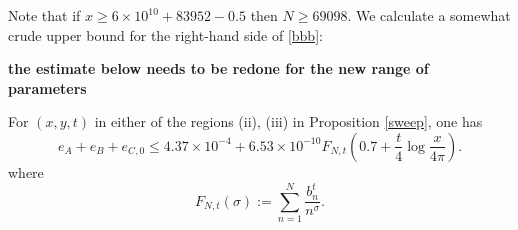 Note that if $x \geq 6 \times 10^{10} + 83952 - 0.5$ then $N \geq 69098$.  We calculate a somewhat crude upper bound for the right-hand side of \eqref{bbb}:

{\bf the estimate below needs to be redone for the new range of parameters}

\begin{lemma}\label{lac} For $(x,y,t)$ in either of the regions (ii), (iii) in Proposition \ref{sweep}, one has
$$ e_A + e_B + e_{C,0} \leq 4.37 \times 10^{-4} + 6.53 \times 10^{-10} F_{N,t}(0.7 + \frac{t}{4} \log \frac{x}{4\pi}).$$
where
\begin{equation}\label{fnt-def}
 F_{N,t}( \sigma ) := \sum_{n=1}^N \frac{b_n^t}{n^\sigma}.
\end{equation}
\end{lemma}


